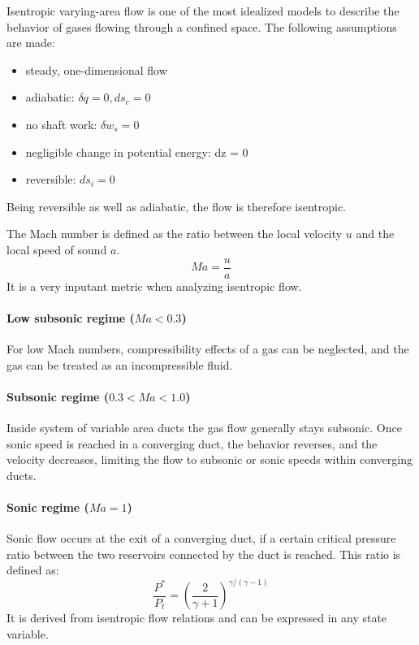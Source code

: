 	Isentropic varying-area flow is one of the most idealized models to describe the behavior of gases flowing through a confined space. The following assumptions are made:
	\begin{itemize}
		\item steady, one-dimensional flow
		\item adiabatic: $\delta q = 0, ds_e = 0$
		\item no shaft work: $\delta w_s = 0$
		\item negligible change in potential energy: dz = 0
		\item reversible: $ds_i = 0$
	\end{itemize}
	Being reversible as well as adiabatic, the flow is therefore isentropic.


	The Mach number is defined as the ratio between the local velocity $u$ and the local speed of sound $a$.
	$$
		Ma = \frac{u}{a}
	$$
	It is a very inputant metric when analyzing isentropic flow.

\paragraph{Low subsonic regime (\(Ma < 0.3\))}

	For low Mach numbers, compressibility effects of a gas can be neglected, and the gas can be treated as an incompressible fluid.

\paragraph{Subsonic regime (\(0.3 < Ma < 1.0\))} 

	Inside system of variable area ducts the gas flow generally stays subsonic.
	Once sonic speed is reached in a converging duct, the behavior reverses, and the velocity decreases, limiting the flow to subsonic or sonic speeds within converging ducts.\\
	
		
\paragraph{Sonic regime (\(Ma = 1\))}
	
	Sonic flow occurs at the exit of a converging duct, if a certain critical pressure ratio between the two reservoirs connected by the duct is reached.
	This ratio is defined as:
	$$
		\frac{P^*}{P_t}=\left(\frac{2}{\gamma + 1}\right)^{\gamma/(\gamma - 1)}
	$$ 
	It is derived from isentropic flow relations and can be expressed in any state variable.
